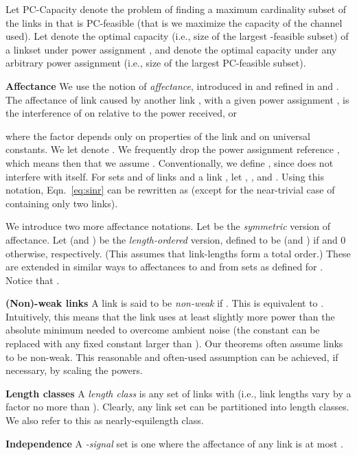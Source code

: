 \documentclass[11pt]{amsart}
\newcommand{\header}[1]{\smallskip\noindent\textbf{#1}\quad}
\newcommand{\prob}[1]{\textsf{#1}}  \newcommand{\alg}[1]{\textbf{#1}}
\begin{document}
Let \prob{PC-Capacity} denote the problem of finding a maximum
cardinality subset of the links in  that is PC-feasible (that is we maximize the capacity of the channel used).
Let  denote the optimal capacity (i.e., size of the largest -feasible subset) of a linkset  under
power assignment , and  denote the optimal capacity under
any arbitrary power assignment (i.e., size of the largest PC-feasible subset). 

\header{Affectance}
We use the notion of \emph{affectance}, introduced in
\cite{GHWW09} and refined in \cite{HW09} and \cite{KV10}.  
The affectance  of link  caused by another link ,
with a given power assignment ,
is the interference of  on  relative to the power
received, or

where the factor 
depends only on properties of the link  and on universal constants. 
We let  denote .
We frequently drop the power assignment reference , which means then that we assume .
Conventionally,  we define , since  does not interfere with itself.
For sets  and  of links and a link , 
let , , and .
Using this notation, Eqn.\ \ref{eq:sinr} can be rewritten as 
(except for the near-trivial case of  containing only two links).



We introduce two more affectance notations.
Let  be the \emph{symmetric} version of affectance.
Let  (and ) be the \emph{length-ordered} version,
defined to be  (and ) if  and 0
otherwise, respectively. (This assumes that link-lengths form a total order.)
These are extended in similar ways to affectances to and from sets as
defined for . Notice that .


\header{(Non)-weak links}
A link is said to be \emph{non-weak} if .
This is equivalent to .
Intuitively, this means that the link uses at least slightly more power than the absolute minimum
needed to overcome ambient noise (the constant  can be replaced with any fixed constant larger than ). Our theorems often assume links to 
be non-weak. This reasonable and often-used assumption \cite{DBLP:conf/infocom/AndrewsD09,Dinitz2010,Goussevskaia2008Local,KV10} 
can be achieved, if necessary, by scaling the powers.

\header{Length classes}
A \emph{length class} is any set  of links with  (i.e., link 
lengths vary by a factor no more than ). Clearly, any link set  can be partitioned
into  length classes. We also refer to this as nearly-equilength class.



\header{Independence}
\iffalse
A \emph{-signal} set is one where the
affectance of any link is at most .
\end{document}
